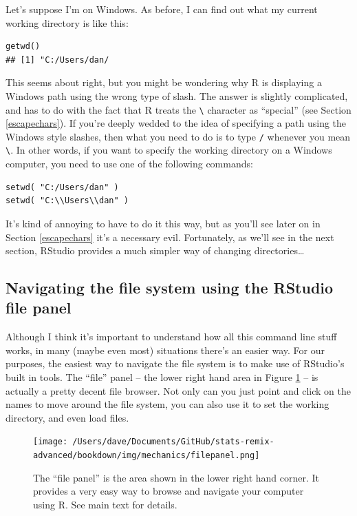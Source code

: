 \documentclass[
]{book}
\begin{document}
Let's suppose I'm on Windows. As before, I can find out what my current working directory is like this:

\begin{verbatim}
getwd()
## [1] "C:/Users/dan/
\end{verbatim}

This seems about right, but you might be wondering why R is displaying a Windows path using the wrong type of slash. The answer is slightly complicated, and has to do with the fact that R treats the \texttt{\textbackslash{}} character as ``special'' (see Section \ref{escapechars}). If you're deeply wedded to the idea of specifying a path using the Windows style slashes, then what you need to do is to type \texttt{/} whenever you mean \texttt{\textbackslash{}}. In other words, if you want to specify the working directory on a Windows computer, you need to use one of the following commands:

\begin{verbatim}
setwd( "C:/Users/dan" )
setwd( "C:\\Users\\dan" )
\end{verbatim}

It's kind of annoying to have to do it this way, but as you'll see later on in Section \ref{escapechars} it's a necessary evil. Fortunately, as we'll see in the next section, RStudio provides a much simpler way of changing directories\ldots{}

\hypertarget{nav3}{%
\subsection{Navigating the file system using the RStudio file panel}\label{nav3}}

Although I think it's important to understand how all this command line stuff works, in many (maybe even most) situations there's an easier way. For our purposes, the easiest way to navigate the file system is to make use of RStudio's built in tools. The ``file'' panel -- the lower right hand area in Figure \ref{fig:filepanel} -- is actually a pretty decent file browser. Not only can you just point and click on the names to move around the file system, you can also use it to set the working directory, and even load files.

\begin{figure}
\centering
\texttt{[image: /Users/dave/Documents/GitHub/stats-remix-advanced/bookdown/img/mechanics/filepanel.png]}
\caption{\label{fig:filepanel}The ``file panel'' is the area shown in the lower right hand corner. It provides a very easy way to browse and navigate your computer using R. See main text for details.}
\end{figure}
\end{document}
